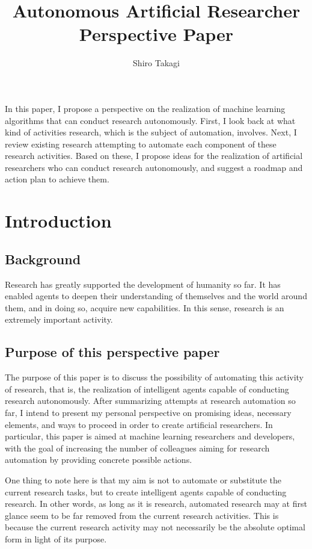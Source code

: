 \documentclass{book}
\title{Autonomous Artificial Researcher Perspective Paper}
\author{Shiro Takagi}
\newenvironment{abstract}{}{}
\begin{document}
\sloppy
\maketitle
\tableofcontents

\begin{abstract}
    In this paper, I propose a perspective on the realization of machine learning algorithms that can conduct research autonomously. First, I look back at what kind of activities research, which is the subject of automation, involves. Next, I review existing research attempting to automate each component of these research activities. Based on these, I propose ideas for the realization of artificial researchers who can conduct research autonomously, and suggest a roadmap and action plan to achieve them.
\end{abstract}

\chapter{Introduction}

\section{Background}
Research has greatly supported the development of humanity so far. It has enabled agents to deepen their understanding of themselves and the world around them, and in doing so, acquire new capabilities. In this sense, research is an extremely important activity.

\section{Purpose of this perspective paper}

The purpose of this paper is to discuss the possibility of automating this activity of research, that is, the realization of intelligent agents capable of conducting research autonomously. After summarizing attempts at research automation so far, I intend to present my personal perspective on promising ideas, necessary elements, and ways to proceed in order to create artificial researchers. In particular, this paper is aimed at machine learning researchers and developers, with the goal of increasing the number of colleagues aiming for research automation by providing concrete possible actions.

One thing to note here is that my aim is not to automate or substitute the current research tasks, but to create intelligent agents capable of conducting research. In other words, as long as it is research, automated research may at first glance seem to be far removed from the current research activities. This is because the current research activity may not necessarily be the absolute optimal form in light of its purpose. 
\end{document}
